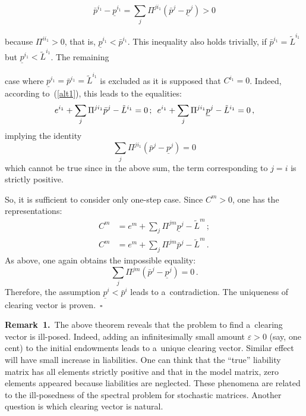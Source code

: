 \begin{multicols}{2}
\vspace*{3pt}

\noindent
$$
\bar p^{i_1}-\underline p^{i_1}=\sum\limits_j\Pi^{ji_1}\left(\bar p^j-\underline p^j\right)>0
$$

\vspace*{-6pt}

\noindent
because   $\Pi^{ii_1}>0$, that is, $\underline p^{i_1}<  \bar p^{i_1}$. This 
inequality also holds trivially, if
$\bar p^{i_1}= \tilde L^{i_1}$ but $\underline p^{i_1}< \tilde L^{i_1}$.
 The remaining\linebreak\vspace*{-12pt}
 
 \pagebreak
 
 \noindent
  case where
$\underline p^{i_1}=\bar p^{i_1}=\tilde L^{i_1}$ is excluded as it is supposed that 
$C^{i_1}=0$.  Indeed, according to~(\ref{alt1}),  this leads to the equalities:
$$
e^{i_1}+ \sum\limits_j\Pi^{ji_1}\bar p^j - \tilde L^{i_1}=0\,;\enskip
e^{i_1}+  \sum\limits_j\Pi^{ji_1}\underline p^j - \tilde L^{i_1}=0\,,
$$
implying the identity
$$
\sum\limits_j\Pi^{ji_1}\left(\bar p^j-\underline p^j\right)=0
$$
which cannot be true since in the above sum, the term corresponding to $j=i$ is 
strictly positive.

So, it is sufficient to consider only one-step case. Since $C^m>0$, one has the 
representations:
\begin{align*}
C^m&=e^{m}+ \sum\limits_j\Pi^{jm}\underline p^j - \tilde L^{m}\,; \\
C^m&=e^{m}+ \sum\limits_j\Pi^{jm}\bar p^j- \tilde L^{m}\,.
\end{align*}
As above, one again obtains the impossible equality:
$$
\sum\limits_j\Pi^{jm}\left(\bar p^j-\underline p^j\right)=0\,.
$$
Therefore, the  assumption $\underline p^i<\bar p^i$ leads to a~contradiction. 
The
uniqueness of clearing vector is proven.~$\square$


\smallskip

\noindent
\textbf{Remark~1.}\
The above  theorem reveals that the problem to find a~clearing 
vector is ill-posed. Indeed, adding an infinitesimally small amount $\varepsilon>0$ 
(say,  one cent) to the initial endowments leads to a~unique clearing vector. Similar 
effect will have small increase in liabilities. One can think that the ``true'' 
liability matrix has all elements strictly positive and that in the model matrix, zero 
elements appeared because liabilities are neglected.
These phenomena are related to the ill-posedness of the spectral problem for 
stochastic matrices. Another question is which clearing vector is natural.



\end{multicols}
